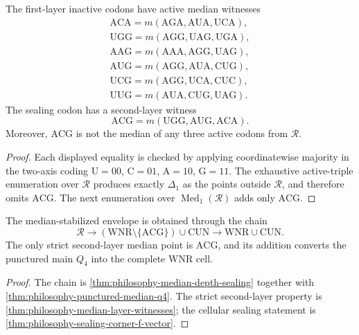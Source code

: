 \begin{theorem}
\label{thm:philosophy-median-layer-witnesses}
The first-layer inactive codons have active median witnesses
$$
\begin{gathered}
  \mathrm{ACA}=m(\mathrm{AGA},\mathrm{AUA},\mathrm{UCA}),\\
  \mathrm{UGG}=m(\mathrm{AGG},\mathrm{UAG},\mathrm{UGA}),\\
  \mathrm{AAG}=m(\mathrm{AAA},\mathrm{AGG},\mathrm{UAG}),\\
  \mathrm{AUG}=m(\mathrm{AGG},\mathrm{AUA},\mathrm{CUG}),\\
  \mathrm{UCG}=m(\mathrm{AGG},\mathrm{UCA},\mathrm{CUC}),\\
  \mathrm{UUG}=m(\mathrm{AUA},\mathrm{CUG},\mathrm{UAG}).
\end{gathered}
$$
The sealing codon has a second-layer witness
$$
  \mathrm{ACG}=m(\mathrm{UGG},\mathrm{AUG},\mathrm{ACA}).
$$
Moreover, $\mathrm{ACG}$ is not the median of any three active codons
from $\mathcal{R}$.
\end{theorem}
\begin{proof}
Each displayed equality is checked by applying coordinatewise majority
in the two-axis coding
$\mathrm{U}=00$, $\mathrm{C}=01$, $\mathrm{A}=10$, $\mathrm{G}=11$.
The exhaustive active-triple enumeration over $\mathcal{R}$ produces
exactly $\Delta_{1}$ as the points outside $\mathcal{R}$, and therefore omits
$\mathrm{ACG}$. The next enumeration over
$\operatorname{Med}_{1}(\mathcal{R})$ adds only $\mathrm{ACG}$.
\end{proof}

\begin{theorem}
\label{thm:philosophy-median-depth-and-sealing-corner}
The median-stabilized envelope is obtained through the chain
$$
  \mathcal{R}
  \longrightarrow
  (\mathrm{WNR}\setminus\{\mathrm{ACG}\})\cup\mathrm{CUN}
  \longrightarrow
  \mathrm{WNR}\cup\mathrm{CUN}.
$$
The only strict second-layer median point is $\mathrm{ACG}$, and its
addition converts the punctured main $Q_{4}$ into the complete
$\mathrm{WNR}$ cell.
\end{theorem}
\begin{proof}
The chain is
\autoref{thm:philosophy-median-depth-sealing} together with
\autoref{thm:philosophy-punctured-median-q4}. The strict second-layer
property is \autoref{thm:philosophy-median-layer-witnesses}; the
cellular sealing statement is
\autoref{thm:philosophy-sealing-corner-f-vector}.
\end{proof}


